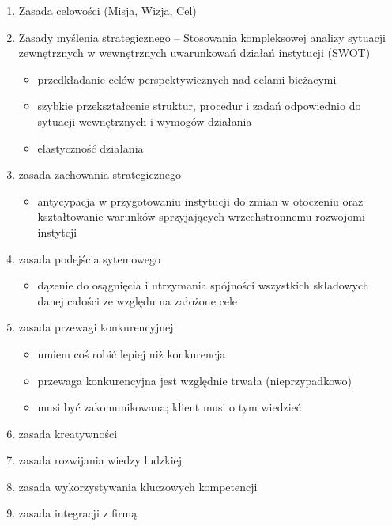 \documentclass[a4paper,10pt]{report}
\begin{document}
\begin{enumerate}
	\item Zasada celowości (Misja, Wizja, Cel)
	\item Zasady myślenia strategicznego -- Stosowania kompleksowej analizy sytuacji zewnętrznych w wewnętrznych uwarunkowań działań instytucji (SWOT)
	\begin{itemize}
		\item przedkładanie celów perspektywicznych nad celami bieżacymi
		\item szybkie przekształcenie struktur, procedur i zadań odpowiednio do sytuacji wewnętrznych i wymogów działania
		\item elastyczność działania
	\end{itemize}
	\item zasada zachowania strategicznego
	\begin{itemize}
		\item antycypacja w przygotowaniu instytucji do zmian w otoczeniu oraz kształtowanie warunków sprzyjających wrzechstronnemu rozwojomi instytcji
\end{itemize}
	\item zasada podejścia sytemowego
	\begin{itemize}
		\item dązenie do osągnięcia i utrzymania spójności wszystkich składowych danej całości ze względu na założone cele
	\end{itemize}
	\item zasada przewagi konkurencyjnej
	\begin{itemize}
		\item umiem coś robić lepiej niż konkurencja
		\item przewaga konkurencyjna jest względnie trwała (nieprzypadkowo)
		\item musi być zakomunikowana; klient musi o tym wiedzieć
	\end{itemize}
	\item zasada kreatywności
	\item zasada rozwijania wiedzy ludzkiej
	\item zasada wykorzystywania kluczowych kompetencji
	\item zasada integracji z firmą
\end{enumerate}
\end{document}
